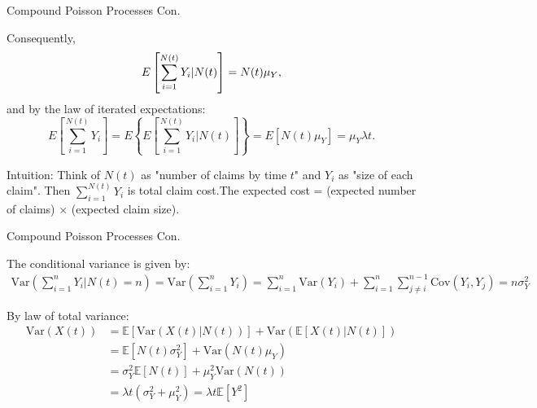 \documentclass{beamer}
\begin{document}
\begin{frame}{Compound Poisson Processes Con.}

    {\footnotesize \footnotesize
    \par Consequently,
    \[
    E \left[ \sum_{i=1}^{N(t)} Y_i | N(t) \right] = N(t) \mu_Y,
    \vspace{1em}
    \]
    and by the law of iterated expectations:
    \vspace{1em}
    \[
    E \left[ \sum_{i=1}^{N(t)} Y_i \right] = E \left\{ E \left[ \sum_{i=1}^{N(t)} Y_i | N(t) \right] \right\} = E [N(t) \mu_Y] = \mu_Y \lambda t.
    \]
    \vspace{1em}
    \par Intuition: Think of \(N(t)\) as "number of claims by time \(t\)" and \(Y_i\) as "size of each claim".  
     Then \(\sum_{i=1}^{N(t)} Y_i\) is total claim cost.The expected cost = (expected number of claims) × (expected claim size).
    }
    
\end{frame}

\begin{frame}{Compound Poisson Processes Con.}

    {\footnotesize \footnotesize
    \par  The conditional variance is given by:
    \vspace{1em }
    \begin{align*}
        \text{Var}(\sum_{i=1}^n Y_i | N(t) = n) = \text{Var}\left(\sum_{i=1}^n Y_i\right) 
        =\sum_{i=1}^n \text{Var}(Y_i) +  \sum_{i=1}^n \sum_{j \neq i}^{n-1} \text{Cov}(Y_i, Y_j)= n\sigma^2_Y
    \end{align*}
    \par By law of total variance:
    \vspace{1em }
    \begin{align*}
        \text{Var}(X(t)) &= \mathbb{E}[\text{Var}(X(t) | N(t))] + \text{Var}(\mathbb{E}[X(t) | N(t)])\\
        &= \mathbb{E}[N(t)\sigma_Y^2] + \text{Var}(N(t)\mu_Y) \\
        &= \sigma_Y^2 \mathbb{E}[N(t)] + \mu_Y^2 \text{Var}(N(t))\\
        & =  \lambda t (\sigma_Y^2 + \mu_Y^2) = \lambda t \mathbb{E}[Y^2]
    \end{align*}


    }
    
\end{frame}
\end{document}
